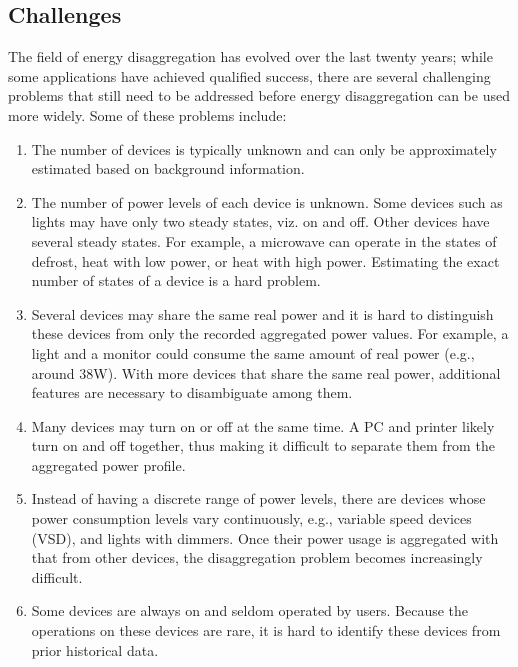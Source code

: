 \subsection {Challenges}
The field of energy disaggregation has evolved
over the last twenty years; while
some applications have achieved
qualified success, there are several challenging
problems that still need to be addressed before energy disaggregation can be
used more widely. Some of these problems include:

\begin{enumerate}
\item The number of devices is typically unknown and can only be
approximately estimated based on background information.

\item The number of power levels of each device is unknown.
Some devices such as lights may have only two steady states, viz. on and off.
Other devices  have several steady states.
For example, a microwave can operate in the states of defrost,
heat with low power, or heat with high power. Estimating
the exact number of states of a device is a hard problem.

\item Several devices may share the same real power and
it is hard to distinguish these devices from only the recorded aggregated
power values. 
For example, a light and a monitor could consume the same amount of real
power (e.g., around 38W). With more devices that share the same real power,
additional features are necessary to disambiguate among them.

\item Many devices may turn on or off at the same time.
A PC and printer likely turn on and off together, 
thus making it difficult to separate them from the aggregated power profile.

\item Instead of having a discrete range of power
levels, there are devices whose power consumption levels
   vary continuously, e.g.,
  variable speed devices (VSD), and lights with dimmers.
Once their power usage is aggregated with that from other devices, the
disaggregation problem becomes increasingly difficult.

\item Some devices are always on and seldom operated by
users. Because the operations on these devices are
rare, it is hard to identify these devices from prior historical data.

\end{enumerate}

